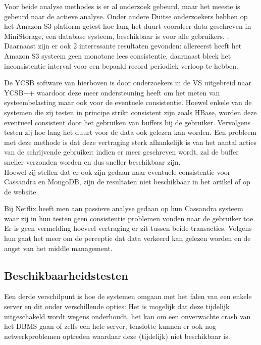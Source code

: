 Voor beide analyse methodes is er al onderzoek gebeurd, maar het meeste is gebeurd naar de actieve analyse. Onder andere Duitse onderzoekers hebben op het Amazon S3 platform getest hoe lang het duurt vooraleer data geschreven in MiniStorage, een database systeem, beschikbaar is voor alle gebruikers. \cite{bermbach2011eventual}. \\
Daarnaast zijn er ook 2 interessante resultaten gevonden: allereerst heeft het Amazon S3 systeem geen monotone lees consistentie, daarnaast bleek het inconsistentie interval voor een bepaald record periodiek verloop te hebben. 

De YCSB software van hierboven is door onderzoekers in de VS uitgebreid naar YCSB++\cite{patil2011ycsb++} waardoor deze meer ondersteuning heeft om het meten van systeembelasting maar ook voor de eventuele consistentie. Hoewel enkele van de systemen die zij testen in principe strikt consistent zijn zoals HBase, worden deze eventueel consistent door het gebruiken van buffers bij de gebruiker. Vervolgens testen zij hoe lang het duurt voor de data ook gelezen kan worden. Een probleem met deze methode is dat deze vertraging sterk afhankelijk is van het aantal acties van de schrijvende gebruiker: indien er meer geschreven wordt, zal de buffer sneller verzonden worden en dus sneller beschikbaar zijn. \\
Hoewel zij stellen dat er ook zijn gedaan naar eventuele consistentie voor Cassandra en MongoDB, zijn de resultaten niet beschikbaar in het artikel of op de website. 

Bij Netflix heeft men aan passieve analyse gedaan op hun Cassandra systeem \cite{kalantzisnetflix} waar zij in hun testen geen consistentie problemen vonden naar de gebruiker toe. Er is geen vermelding hoeveel vertraging er zit tussen beide transacties. Volgens hun gaat het meer om de perceptie dat data verkeerd kan gelezen worden en de angst van het middle management. 

\subsection{Beschikbaarheidstesten} 
Een derde verschilpunt is hoe de systemen omgaan met het falen van een enkele server en dit onder verschillende opties: Het is mogelijk dat deze tijdelijk uitgeschakeld wordt wegens onderhoudt, het kan om een onverwachte crash van het DBMS gaan of zelfs een hele server, tenslotte kunnen er ook nog netwerkproblemen optreden waardaar deze (tijdelijk) niet beschikbaar is. 

